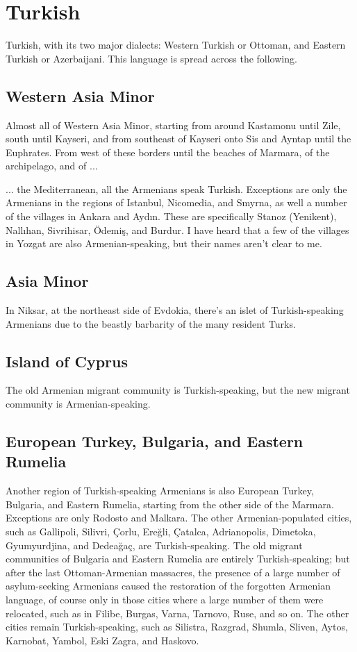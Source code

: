 \section{Turkish}

Turkish, with its two major dialects: Western Turkish or Ottoman, and Eastern Turkish or Azerbaijani. This language is spread across the following. 

\subsection{Western Asia Minor}

Almost all of Western Asia Minor, starting from around Kastamonu until Zile, south until Kayseri, and from southeast of Kayseri onto Sis and Ayntap until the Euphrates. From west of these borders until the beaches of Marmara, of the archipelago, and of ... 

\begin{adjarianpage}\label{page:31}\end{adjarianpage}%

... the Mediterranean, all the Armenians speak Turkish. Exceptions are only the Armenians in the regions of Istanbul, Nicomedia, and Smyrna, as well a number of the villages in Ankara and Aydın. These are specifically Stanoz (Yenikent), Nallıhan, Sivrihisar, Ödemiş, and Burdur. I have heard that a few of the villages in Yozgat are also Armenian-speaking, but their names aren't clear to me. 

\subsection{Asia Minor}
In Niksar, at the northeast side of Evdokia, there's an islet of Turkish-speaking Armenians due to the beastly barbarity of the many resident Turks.
\subsection{Island of Cyprus}

The old Armenian migrant community is Turkish-speaking, but the new migrant community is Armenian-speaking. 
\subsection{European Turkey, Bulgaria, and Eastern Rumelia}
Another region of Turkish-speaking Armenians is also European Turkey, Bulgaria, and Eastern Rumelia, starting from the other side of the Marmara. Exceptions are only Rodosto and Malkara. The other Armenian-populated cities, such as Gallipoli, Silivri, Çorlu, Ereğli, Çatalca, Adrianopolis, Dimetoka, Gyumyurdjina, and Dedeağaç, are Turkish-speaking. The old migrant communities of Bulgaria and Eastern Rumelia are entirely Turkish-speaking; but after the last Ottoman-Armenian massacres, the presence of a large number of asylum-seeking Armenians caused the restoration of the forgotten Armenian language, of course only in those cities where a large number of them were relocated, such as in Filibe, Burgas, Varna, Tarnovo, Ruse, and so on. The other cities remain Turkish-speaking, such as Silistra, Razgrad, Shumla, Sliven, Aytos, Karnobat, Yambol, Eski Zagra, and Haskovo. 
